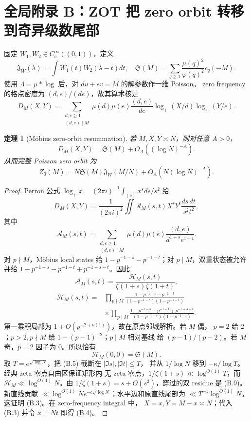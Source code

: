 \documentclass[11pt,a4paper]{ctexart}
\newtheorem{theorem}{定理}[section]
\theoremstyle{definition}
\newcommand{\1}{\mathbf 1}
\begin{document}
\section*{全局附录 B：ZOT 把 zero orbit 转移到奇异级数尾部}

固定 $W_1,W_2\in C_c^\infty((0,1))$，定义
\[
\mathfrak J_W(\lambda)=\int W_1(t)W_2(\lambda-t)dt,
\quad
\mathfrak S(M)=\sum_{q\ge1}\frac{\mu(q)^2}{\varphi(q)^2}c_q(-M). \tag{B.1}
\]
使用 $\Lambda=\mu*\log$ 后，对 $du+ev=M$ 的解参数作一维 Poisson。
zero frequency 的格点密度为 $(d,e)/(de)$，故其算术核是
\[
D_M(X,Y)=\sum_{\substack{d,e\ge1\\(d,e)\mid M}}
\mu(d)\mu(e)\frac{(d,e)}{de}
\log_+(X/d)\log_+(Y/e).                                \tag{B.2}
\]

\begin{theorem}[Möbius zero-orbit resummation]
若 $M,X,Y\asymp N$，则对任意 $A>0$，
\[
\boxed{D_M(X,Y)=\mathfrak S(M)+O_A((\log N)^{-A}).}     \tag{B.3}
\]
从而完整 Poisson zero orbit 为
\[
\boxed{Z_0(M)=N\mathfrak S(M)\mathfrak J_W(M/N)
+O_A(N(\log N)^{-A}).}                                 \tag{B.4}
\]
\end{theorem}

\begin{proof}
Perron 公式 $\log_+x=(2\pi i)^{-1}\int_{(c)}x^sds/s^2$ 给
\[
D_M(X,Y)=\frac1{(2\pi i)^2}\iint
\mathcal A_M(s,t)X^sY^t\frac{ds\,dt}{s^2t^2},          \tag{B.5}
\]
其中
\[
\mathcal A_M(s,t)=\sum_{\substack{d,e\ge1\\(d,e)\mid M}}
\mu(d)\mu(e)\frac{(d,e)}{d^{1+s}e^{1+t}}.              \tag{B.6}
\]
对 $p\nmid M$，Möbius local states 给
$1-p^{-1-s}-p^{-1-t}$；对 $p\mid M$，双重状态被允许并给
$1-p^{-1-s}-p^{-1-t}+p^{-1-s-t}$。因此
\[
\mathcal A_M(s,t)=\frac{\mathcal H_M(s,t)}
{\zeta(1+s)\zeta(1+t)},                                \tag{B.7}
\]
\begin{align*}
\mathcal H_M(s,t)
={}&\prod_{p\nmid M}\frac{1-p^{-1-s}-p^{-1-t}}
{(1-p^{-1-s})(1-p^{-1-t})}\\
&\times\prod_{p\mid M}
\frac{1-p^{-1-s}-p^{-1-t}+p^{-1-s-t}}
{(1-p^{-1-s})(1-p^{-1-t})}.                            \tag{B.8}
\end{align*}
第一乘积局部为 $1+O(p^{-2+o(1)})$，故在原点邻域解析。若 $M$ 偶，
$p=2$ 给 $2$；$p>2,p\nmid M$ 给 $1-(p-1)^{-2}$；$p\mid M$ 相对基线
给 $(p-1)/(p-2)$。若 $M$ 奇，$p=2$ 因子为 $0$。所以恰有
\[
\mathcal H_M(0,0)=\mathfrak S(M).                      \tag{B.9}
\]
取 $T=e^{\sqrt{\log N}}$，把 (B.5) 截断在 $|\Im s|,|\Im t|\le T$，
并从 $1/\log N$ 移到 $-\kappa/\log T$。经典 zeta 零点自由区保证矩形内
无 zeta 零点，$1/\zeta(1+s)\ll\log^{O(1)}T$，而
$\mathcal H_M\ll\log^{O(1)}N$。由
$1/\zeta(1+s)=s+O(s^2)$，穿过的双 residue 是 (B.9)。新直线贡献
$\ll\log^{O(1)}N e^{-c\sqrt{\log N}}$；水平边和原直线尾部为
$\ll T^{-1}\log^{O(1)}N$。这证明 (B.3)。在 zero-frequency integral 中，
$X=x,Y=M-x\asymp N$；代入 (B.3) 并令 $x=Nt$ 即得 (B.4)。
\end{proof}
\end{document}
